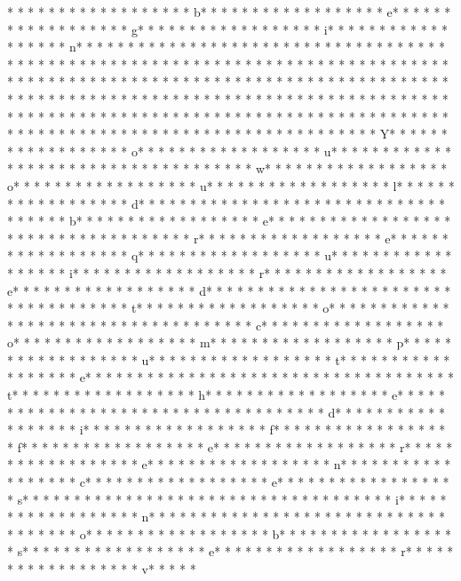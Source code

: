* * *  * * *  * * *  *  * * *  *  * * *  * b* * *  * * *  * * *  *  * * *  *  * * *  * e* * *  * * *  * * *  *  * * *  *  * * *  * g* * *  * * *  * * *  *  * * *  *  * * *  * i* * *  * * *  * * *  *  * * *  *  * * *  * n* * *  * * *  * * *  *  * * *  *  * * *  * {* * *  * * *  * * *  *  * * *  *  * * *  *  * * *  * * *  * * *  *  * * *  *  * * *  * }* * *  * * *  * * *  *  * * *  *  * * *  * 
* * *  * * *  * * *  *  * * *  *  * * *  * * *  * * *  *  * * *  *  * * *  * * *  * * *  *  * * *  *  * * *  *  * * *  * * *  * * *  *  * * *  *  * * *  *  * * *  * * *  * * *  *  * * *  *  * * *  *  * * *  * * *  * * *  *  * * *  *  * * *  *  * * *  * * *  * * *  *  * * *  *  * * *  *  * * *  * * *  * * *  *  * * *  *  * * *  *  * * *  * * *  * * *  *  * * *  *  * * *  *  * * *  * * *  * * *  *  * * *  *  * * *  * Y* * *  * * *  * * *  *  * * *  *  * * *  * o* * *  * * *  * * *  *  * * *  *  * * *  * u* * *  * * *  * * *  *  * * *  *  * * *  *  * * *  * * *  * * *  *  * * *  *  * * *  * w* * *  * * *  * * *  *  * * *  *  * * *  * o* * *  * * *  * * *  *  * * *  *  * * *  * u* * *  * * *  * * *  *  * * *  *  * * *  * l* * *  * * *  * * *  *  * * *  *  * * *  * d* * *  * * *  * * *  *  * * *  *  * * *  *  * * *  * * *  * * *  *  * * *  *  * * *  * b* * *  * * *  * * *  *  * * *  *  * * *  * e* * *  * * *  * * *  *  * * *  *  * * *  *  * * *  * * *  * * *  *  * * *  *  * * *  * r* * *  * * *  * * *  *  * * *  *  * * *  * e* * *  * * *  * * *  *  * * *  *  * * *  * q* * *  * * *  * * *  *  * * *  *  * * *  * u* * *  * * *  * * *  *  * * *  *  * * *  * i* * *  * * *  * * *  *  * * *  *  * * *  * r* * *  * * *  * * *  *  * * *  *  * * *  * e* * *  * * *  * * *  *  * * *  *  * * *  * d* * *  * * *  * * *  *  * * *  *  * * *  *  * * *  * * *  * * *  *  * * *  *  * * *  * t* * *  * * *  * * *  *  * * *  *  * * *  * o* * *  * * *  * * *  *  * * *  *  * * *  *  * * *  * * *  * * *  *  * * *  *  * * *  * c* * *  * * *  * * *  *  * * *  *  * * *  * o* * *  * * *  * * *  *  * * *  *  * * *  * m* * *  * * *  * * *  *  * * *  *  * * *  * p* * *  * * *  * * *  *  * * *  *  * * *  * u* * *  * * *  * * *  *  * * *  *  * * *  * t* * *  * * *  * * *  *  * * *  *  * * *  * e* * *  * * *  * * *  *  * * *  *  * * *  *  * * *  * * *  * * *  *  * * *  *  * * *  * t* * *  * * *  * * *  *  * * *  *  * * *  * h* * *  * * *  * * *  *  * * *  *  * * *  * e* * *  * * *  * * *  *  * * *  *  * * *  *  * * *  * * *  * * *  *  * * *  *  * * *  * d* * *  * * *  * * *  *  * * *  *  * * *  * i* * *  * * *  * * *  *  * * *  *  * * *  * f* * *  * * *  * * *  *  * * *  *  * * *  * f* * *  * * *  * * *  *  * * *  *  * * *  * e* * *  * * *  * * *  *  * * *  *  * * *  * r* * *  * * *  * * *  *  * * *  *  * * *  * e* * *  * * *  * * *  *  * * *  *  * * *  * n* * *  * * *  * * *  *  * * *  *  * * *  * c* * *  * * *  * * *  *  * * *  *  * * *  * e* * *  * * *  * * *  *  * * *  *  * * *  * s* * *  * * *  * * *  *  * * *  *  * * *  *  * * *  * * *  * * *  *  * * *  *  * * *  * i* * *  * * *  * * *  *  * * *  *  * * *  * n* * *  * * *  * * *  *  * * *  *  * * *  *  * * *  * * *  * * *  *  * * *  *  * * *  * o* * *  * * *  * * *  *  * * *  *  * * *  * b* * *  * * *  * * *  *  * * *  *  * * *  * s* * *  * * *  * * *  *  * * *  *  * * *  * e* * *  * * *  * * *  *  * * *  *  * * *  * r* * *  * * *  * * *  *  * * *  *  * * *  * v* * *  * * 